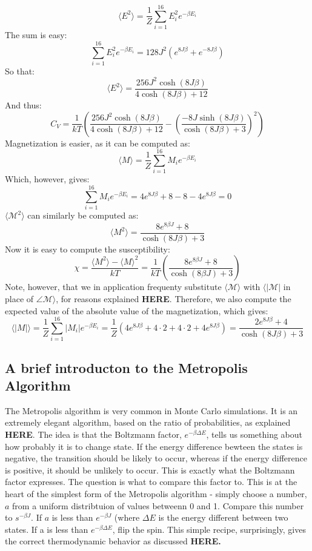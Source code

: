 \documentclass[a4paper, 10pt]{article}
\begin{document}
$$\langle E^2\rangle=\frac{1}{Z} \sum_{i=1}^ {16}E_i^2e^{-\beta E_i}$$
The sum is easy:
$$\sum_{i=1}^{16}E_i^2e^{-\beta E_i}=128J^2\left(e^{8J\beta}+e^{-8J\beta}\right)$$
So that:
$$\langle E^2\rangle =\frac{256J^2\cosh(8J\beta)}{4\cosh(8J\beta)+12}$$
And thus:
\begin{equation}\label{eq:2x2Cv}
C_V=\frac{1}{kT}\left(\frac{256J^2\cosh(8J\beta)}{4\cosh(8J\beta)+12}-\left(\frac{-8J\sinh(8J\beta)}{\cosh(8J\beta)+3}\right)^2\right)
\end{equation}
Magnetization is easier, as it can be computed as:
$$\langle M \rangle=\frac{1}{Z}\sum_{i=1}^{16}M_ie^{-\beta E_i}$$
Which, however, gives:
$$\sum_{i=1}^{16}M_ie^{-\beta E_i}=4e^{8J\beta}+8-8-4e^{8J\beta}=0$$
$\langle \mathcal{M}^2\rangle$ can similarly be computed as:
$$\langle M^2 \rangle =\frac{8e^{8\beta J}+8}{\cosh(8J\beta)+3}$$
Now it is easy to compute the susceptibility:
\begin{equation}\label{eq:2x2Sus}
\chi = \frac{\langle M^2\rangle - \langle M \rangle^2}{kT}=\frac{1}{kT}\left(\frac{8e^{8\beta J}+8}{\cosh(8\beta J)+3}\right)
\end{equation}
Note, however, that we in application frequenty substitute $\langle \mathcal{M} \rangle$ with $\langle |\mathcal{M}|$ in place of $\angle \mathcal{M} \rangle$, for reasons explained \textbf{HERE}. Therefore, we also compute the expected value of the absolute value of the magnetization, which gives:
\begin{equation}\label{eq:2x2abs_mag}
\langle |M|\rangle =\frac{1}{Z}\sum_{i=1}^{16}|M_i|e^{-\beta E_i}=\frac{1}{Z}\left( 4e^{8J\beta}+4\cdot 2+ 4\cdot 2 +4e^{8J\beta}\right)=\frac{2e^{8J\beta}+4}{\cosh(8J\beta)+3}
\end{equation}

\subsection{A brief introducton to the Metropolis Algorithm}\label{Monte-Carlo_algo}
The Metropolis algorithm is very common in Monte Carlo simulations. It is an extremely elegant algorithm, based on the ratio of probabilities, as explained \textbf{HERE}. The idea is that the Boltzmann factor, $e^{-\beta \Delta E}$, tells us something about how probably it is to change state. If the energy difference bewteen the states is negative, the transition should be likely to occur, whereas if the energy difference is positive, it should be unlikely to occur. This is exactly what the Boltzmann factor expresses. The question is what to compare this factor to. This is at the heart of the simplest form of the Metropolis algorithm - simply choose a number, $a$ from a uniform distribtuion of values betweenn 0 and 1. Compare this number to $s^{-\beta J}$. If $a$ is less than $e^{-\beta J}$ (where  $\Delta E$ is the energy different between two states. If a is less than $e^{-\beta \Delta E}$, flip the spin. This simple recipe, surprisingly, gives the correct thermodynamic behavior as discussed \textbf{HERE.}
\end{document}

